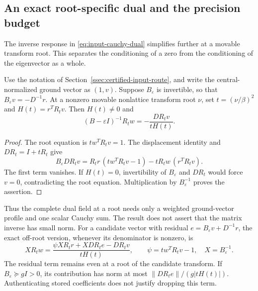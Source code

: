 \subsection{An exact root-specific dual and the precision budget}
\label{ssec:indexed-dual-precision}

The inverse response in \eqref{eq:input-cauchy-dual} simplifies further
at a movable transform root. This separates the conditioning of a zero
from the conditioning of the eigenvector as a whole.

\begin{proposition}
\label{prop:root-specific-dual}
Use the notation of Section~\ref{ssec:certified-input-route}, and write the
central-normalized ground vector as $(1,v)$. Suppose $B_\varepsilon$ is
invertible, so that $B_\varepsilon v=-D^{-1}r$. At a nonzero movable
nonlattice transform root $\nu$, set $t=(\nu/\beta)^2$ and
$H(t)=r^TR_tv$. Then $H(t)\ne0$ and
\begin{equation}\label{eq:root-specific-dual}
 (B-\varepsilon I)^{-1}R_tw=-\frac{DR_tv}{tH(t)}.
\end{equation}
\end{proposition}
\begin{proof}
The root equation is $t w^TR_tv=1$. The displacement identity and
$DR_t=I+tR_t$ give
\[
 B_\varepsilon DR_tv
 =R_tr\,(tw^TR_tv-1)-tR_tw\,(r^TR_tv).
\]
The first term vanishes. If $H(t)=0$, invertibility of $B_\varepsilon$
and $DR_t$ would force $v=0$, contradicting the root equation.
Multiplication by $B_\varepsilon^{-1}$ proves the assertion.
\end{proof}

Thus the complete dual field at a root needs only a weighted ground-vector
profile and one scalar Cauchy sum. The result does not assert that the
matrix inverse has small norm. For a candidate vector with residual
$e=B_\varepsilon v+D^{-1}r$, the exact off-root version, whenever its
denominator is nonzero, is
\begin{equation}\label{eq:root-dual-residual-remainder}
 XR_tw=\frac{\psi XR_tr+XDR_te-DR_tv}{tH(t)},\qquad
 \psi=tw^TR_tv-1,\quad X=B_\varepsilon^{-1}.
\end{equation}
The residual term remains even at a root of the candidate transform.
If $B_\varepsilon\succeq gI>0$, its contribution has norm at most
$\|DR_te\|/(g|tH(t)|)$. Authenticating stored coefficients does not
justify dropping this term.

